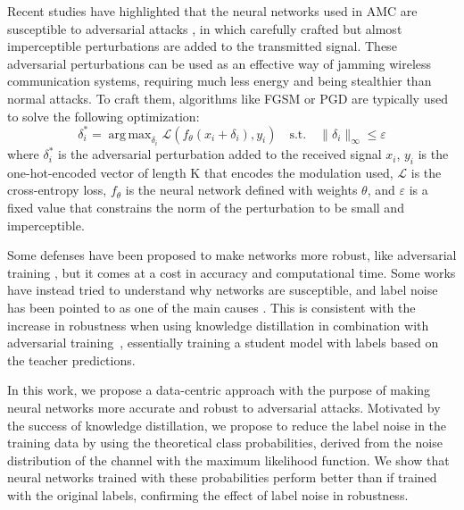 \documentclass[conference]{IEEEtran}
\newcommand{\Ls}{\mathcal{L}}
\DeclareMathOperator*{\argmax}{arg\,max}
\begin{document}
%
Recent studies have highlighted that the neural networks used in AMC are susceptible to adversarial attacks \cite{Szegedy_Zaremba_Sutskever_Bruna_Erhan_Goodfellow_Fergus_2014, moosavi2017universal,Sadeghi_Larsson_2019,Lin_Zhao_2020,Flowers_Buehrer_Headley_2019, maroto2021benefits}, in which carefully crafted but almost imperceptible perturbations are added to the transmitted signal. These adversarial perturbations can be used as an effective way of jamming wireless communication systems, requiring much less energy and being stealthier than normal attacks. To craft them, algorithms like FGSM \cite{Goodfellow_Shlens_Szegedy_2015} or PGD \cite{Madry_Makelov_Schmidt_Tsipras_Vladu_2019} are typically used to solve the following optimization:
\begin{equation}
\label{eq:adv_pert}
    \delta_i^* = \argmax_{\delta_i}\Ls(f_{\theta}(x_i + \delta_i), y_i) \quad \text{s.t.} \quad \lVert \delta_i \rVert_{\infty} \leq \varepsilon
\end{equation}
where $\delta_i^*$ is the adversarial perturbation added to the received signal $x_i$, $y_i$ is the one-hot-encoded vector of length K that encodes the modulation used, $\Ls$ is the cross-entropy loss, $f_{\theta}$ is the neural network defined with weights $\theta$, and $\varepsilon$ is a fixed value that constrains the norm of the perturbation to be small and imperceptible.

Some defenses have been proposed to make networks more robust, like adversarial training \cite{Madry_Makelov_Schmidt_Tsipras_Vladu_2019}, but it comes at a cost in accuracy and computational time. Some works have instead tried to understand why networks are susceptible, and label noise has been pointed to as one of the main causes \cite{sanyal2020benign}. This is consistent with the increase in robustness when using knowledge distillation in combination with adversarial training~\cite{goldblum2020adversarially,zi2021revisiting,shao2021and,maroto2022benefits}, essentially training a student model with labels based on the teacher predictions.

In this work, we propose a data-centric approach with the purpose of making neural networks more accurate and robust to adversarial attacks. Motivated by the success of knowledge distillation, we propose to reduce the label noise in the training data by using the theoretical class probabilities, derived from the noise distribution of the channel with the maximum likelihood function. We show that neural networks trained with these probabilities perform better than if trained with the original labels, confirming the effect of label noise in robustness.
\end{document}
